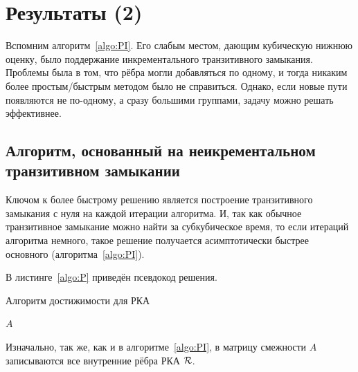 \section{Результаты (2)}\label{section:dyck_1}

Вспомним алгоритм~\ref{algo:PI}. Его слабым местом, дающим кубическую нижнюю оценку, было поддержание инкрементального транзитивного замыкания. Проблемы была в том, что рёбра могли добавляться по одному, и тогда никаким более простым/быстрым методом было не справиться. Однако, если новые пути появляются не по-одному, а сразу большими группами, задачу можно решать эффективнее.

\subsection{Алгоритм, основанный на неикрементальном транзитивном замыкании}

Ключом к более быстрому решению является построение транзитивного замыкания с нуля на каждой итерации алгоритма. И, так как обычное транзитивное замыкание можно найти за субкубическое время, то если итераций алгоритма немного, такое решение получается асимптотически быстрее основного (алгоритма~\ref{algo:PI}).

В листинге~\ref{algo:P} приведён псевдокод решения.

\begin{algorithm}[h]
    \begin{algorithmic}[1]
    \caption{Алгоритм достижимости для РКА}
    \label{algo:P}
                        \EndIf
                    \EndFor
               \EndFor
            \EndFor
        \EndWhile
    \State \Return $A$
    \EndFunction
    \end{algorithmic}
\end{algorithm}

Изначально, так же, как и в алгоритме~\ref{algo:PI}, в матрицу смежности $A$ записываются все внутренние рёбра РКА $\mathcal{R}$.

